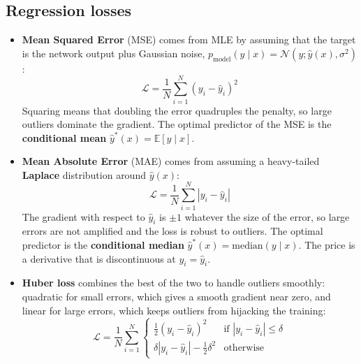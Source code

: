 \subsection{Regression losses}
\begin{itemize}
    \item \textbf{Mean Squared Error} (MSE) comes from MLE by assuming that the
          target is the network output plus Gaussian noise,
          $p_{\text{model}}(y \mid x) = \mathcal{N}(y; \hat{y}(x), \sigma^2)$:
          \begin{equation}
              \mathcal{L} = \frac{1}{N} \sum_{i=1}^N (y_i - \hat{y}_i)^2
          \end{equation}
          Squaring means that doubling the error quadruples the penalty, so large
          outliers dominate the gradient. The optimal predictor of the MSE is the
          \textbf{conditional mean} $\hat{y}^*(x) = \mathbb{E}[y \mid x]$.
    \item \textbf{Mean Absolute Error} (MAE) comes from assuming a heavy-tailed
          \textbf{Laplace} distribution around $\hat{y}(x)$:
          \begin{equation}
              \mathcal{L} = \frac{1}{N} \sum_{i=1}^N |y_i - \hat{y}_i|
          \end{equation}
          The gradient with respect to $\hat{y}_i$ is $\pm 1$ whatever the size of
          the error, so large errors are not amplified and the loss is robust to
          outliers. The optimal predictor is the \textbf{conditional median}
          $\hat{y}^*(x) = \text{median}(y \mid x)$. The price is a derivative that
          is discontinuous at $y_i = \hat{y}_i$.
    \item \textbf{Huber loss} combines the best of the two to handle outliers
          smoothly: quadratic for small errors, which gives a smooth gradient near
          zero, and linear for large errors, which keeps outliers from hijacking
          the training:
          \begin{equation}
              \mathcal{L} = \frac{1}{N} \sum_{i=1}^N \begin{cases}
                  \frac{1}{2}(y_i - \hat{y}_i)^2                  & \text{if } |y_i - \hat{y}_i| \leq \delta \\
                  \delta |y_i - \hat{y}_i| - \frac{1}{2} \delta^2 & \text{otherwise}
              \end{cases}
          \end{equation}
\end{itemize}

